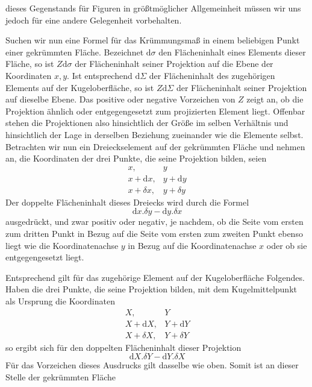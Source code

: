 %
dieses Gegenstands für Figuren in größtmöglicher Allgemeinheit müssen wir uns jedoch für eine andere Gelegenheit vorbehalten.\par\endgroup

Suchen wir nun eine Formel für das Krümmungsmaß in einem beliebigen Punkt einer gekrümmten Fläche. Bezeichnet \(\mathrm{d}\sigma\) den Flächeninhalt eines Elements dieser Fläche, so ist \(Z\mathrm{d}\sigma\) der Flächeninhalt seiner Projektion auf die Ebene der Koordinaten \(x,y\). Ist entsprechend \(\mathrm{d}\Sigma\) der Flächeninhalt des zugehörigen Elements auf der Kugeloberfläche, so ist \(Z\mathrm{d}\Sigma\) der Flächeninhalt seiner Projektion auf dieselbe Ebene. Das positive oder negative Vorzeichen von \(Z\) zeigt an, ob die Projektion ähnlich oder entgegengesetzt zum projizierten Element liegt. Offenbar stehen die Projektionen also hinsichtlich der Größe im selben Verhältnis und hinsichtlich der Lage in derselben Beziehung zueinander wie die Elemente selbst. Betrachten wir nun ein Dreieckselement auf der gekrümmten Fläche und nehmen an, die Koordinaten der drei Punkte, die seine Projektion bilden, seien
\[
\begin{array}{ll}
x,&y\\
x+\mathrm{d}x,&y+\mathrm{d}y\\
x+\delta x,&y+\delta y
\end{array}
\]
Der doppelte Flächeninhalt dieses Dreiecks wird durch die Formel
\[
\mathrm{d}x\mathord{.}\delta y-\mathrm{d}y\mathord{.}\delta x
\]
ausgedrückt, und zwar positiv oder negativ, je nachdem, ob die Seite vom ersten zum dritten Punkt in Bezug auf die Seite vom ersten zum zweiten Punkt ebenso liegt wie die Koordinatenachse \(y\) in Bezug auf die Koordinatenachse \(x\) oder ob sie entgegengesetzt liegt.

Entsprechend gilt für das zugehörige Element auf der Kugeloberfläche Folgendes. Haben die drei Punkte, die seine Projektion bilden, mit dem Kugelmittelpunkt als Ursprung die Koordinaten
\[
\begin{array}{ll}
X,&Y\\
X+\mathrm{d}X,&Y+\mathrm{d}Y\\
X+\delta X,&Y+\delta Y
\end{array}
\]
so ergibt sich für den doppelten Flächeninhalt dieser Projektion
\[
\mathrm{d}X\mathord{.}\delta Y-\mathrm{d}Y\mathord{.}\delta X
\]
Für das Vorzeichen dieses Ausdrucks gilt dasselbe wie oben. Somit ist an dieser Stelle der gekrümmten Fläche %
